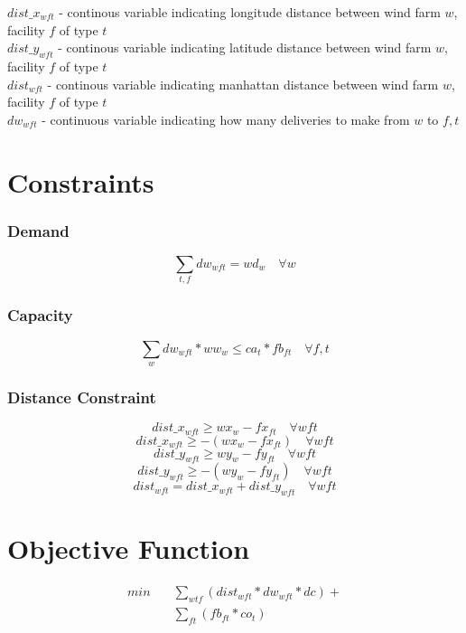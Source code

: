 \documentclass[11pt, oneside]{article}   	%
\begin{document}
$dist\_x_{wft}$ - continous variable indicating longitude distance between wind farm $w$, facility $f$ of type $t$ \\ 
$dist\_y_{wft}$ - continous variable indicating latitude distance between wind farm $w$, facility $f$ of type  $t$ \\
$dist_{wft}$ - continous variable indicating manhattan distance between wind farm $w$, facility $f$ of type $t$ \\
$dw_{wft}$ - continuous variable indicating how many deliveries to make from $w$ to $f,t$ \\


\section*{Constraints}


\subsubsection*{Demand}
$$ \sum_{t,f} dw_{wft} = wd_{w} \quad \forall w $$

\subsubsection*{Capacity}
$$ \sum_{w} dw_{wft} * ww_{w} \le ca_{t} * fb_{ft} \quad \forall f,t $$


\subsubsection*{Distance Constraint}
$$ dist\_x_{wft} \ge wx_{w} - fx_{ft} \quad \forall wft $$
$$ dist\_x_{wft} \ge -( wx_{w} - fx_{ft}) \quad \forall wft $$
$$ dist\_y_{wft} \ge wy_{w} - fy_{ft} \quad \forall wft $$
$$ dist\_y_{wft} \ge -(wy_{w} - fy_{ft}) \quad \forall wft $$
$$ dist_{wft} = dist\_x_{wft} + dist\_y_{wft} \quad \forall wft $$ 


\section*{Objective Function}
\begin{align*}
min 	\quad 	& \sum_{wtf} (dist_{wft} * dw_{wft} * dc ) + \\
        			& \sum_{ft} (fb_{ft} * co_{t})
\end{align*}
\end{document}
